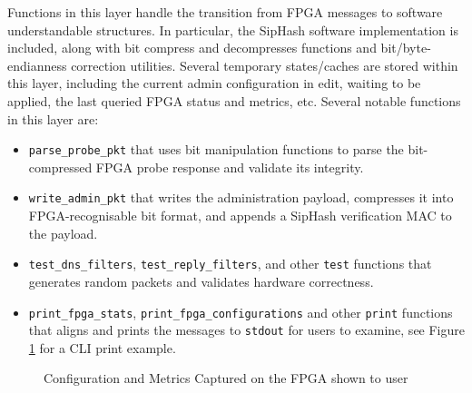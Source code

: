 \documentclass[a4paper]{report}
\newcommand{\code}{\texttt}
\begin{document}
Functions in this layer handle the transition from FPGA messages to software understandable structures. In particular, the SipHash software implementation is included, along with bit compress and decompresses functions and bit/byte-endianness correction utilities. Several temporary states/caches are stored within this layer, including the current admin configuration in edit, waiting to be applied, the last queried FPGA status and metrics, etc. Several notable functions in this layer are:
\begin{itemize}
    \item \code{parse\_probe\_pkt} that uses bit manipulation functions to parse the bit-compressed FPGA probe response and validate its integrity.
    \item \code{write\_admin\_pkt} that writes the administration payload, compresses it into FPGA-recognisable bit format, and appends a SipHash verification MAC to the payload.
    \item \code{test\_dns\_filters}, \code{test\_reply\_filters}, and other \code{test} functions that generates random packets and validates hardware correctness.
    \item \code{print\_fpga\_stats}, \code{print\_fpga\_configurations} and other \code{print} functions that aligns and prints the messages to \code{stdout} for users to examine, see Figure \ref{fig:console-screenshot} for a CLI print example.
\end{itemize}

\begin{figure}[h!]
  \caption{Configuration and Metrics Captured on the FPGA shown to user}
  \label{fig:console-screenshot}
\end{figure}
\end{document}
